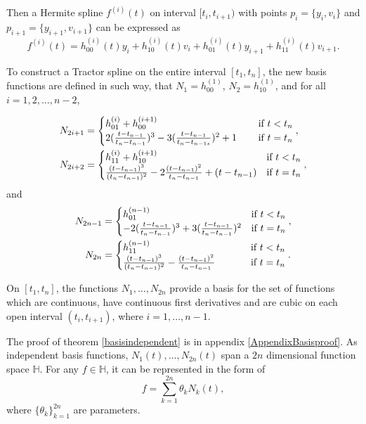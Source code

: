 Then a Hermite spline $f^{(i)}(t)$ on interval $[t_i,t_{i+1})$ with points $p_i=\{y_i,v_i\}$ and $p_{i+1}=\{y_{i+1},v_{i+1} \}$  can be expressed as
\begin{equation}
f^{(i)}(t)=h_{00}^{(i)}(t)y_i+h_{10}^{(i)}(t)v_i+h_{01}^{(i)}(t)y_{i+1} +h_{11}^{(i)}(t)v_{i+1}.
\end{equation}

To construct a Tractor spline on the entire interval $[t_1,t_n]$, the new basis functions are defined in such way, that $N_1 = h^{(1)}_{00}$, $N_2 = h^{(1)}_{10}$, and for all $i=1,2,\ldots,n-2$, 

\begin{align}
N_{2i+1}&=
\begin{cases}
h_{01}^{(i)}+h_{00}^{(i+1)} \hphantom{+(+t_{n}-t_{n-1}-t_{n})1.}  & \mbox{if $t<t_n$}\\
2(\frac{t-t_{n-1}}{t_{n}-t_{n-1}})^3-3(\frac{t-t_{n-1}}{t_{n}-t_{n-1s}})^2+1 &  \mbox{if $t=t_n$}
\end{cases},\\
N_{2i+2}&=
\begin{cases}
 h_{11}^{(i)}+h_{10}^{(i+1)} & \mbox{if $t<t_n$}\\
\frac{(t-t_{n-1})^3}{(t_{n}-t_{n-1})^2}-2\frac{(t-t_{n-1})^2}{t_{n}-t_{n-1}}+(t-t_{n-1}) & \mbox{if $t=t_n$}
\end{cases},
\end{align}
and
\begin{align}
N_{2n-1} &= 
\begin{cases}
h_{01}^{(n-1)} & \mbox{if $t<t_n$}\\ 
-2(\frac{t-t_{n-1}}{t_{n}-t_{n-1}})^3+3(\frac{t-t_{n-1}}{t_{n}-t_{n-1}})^2 & \mbox{if $t=t_n$}
\end{cases},\\
N_{2n} &= 
\begin{cases}
h_{11}^{(n-1)} & \mbox{if $t<t_n$}\\
\frac{(t-t_{n-1})^3}{(t_{n}-t_{n-1})^2}-\frac{(t-t_{n-1})^2}{t_{n}-t_{n-1}}  \hphantom{+t+.} & \mbox{if $t=t_n$}
\end{cases}.
\end{align}

\begin{theorem}\label{basisindependent}
On $[t_1,t_n]$, the functions $N_1,\ldots,N_{2n}$ provide a basis for the set of functions which are continuous, have continuous first derivatives and are 
cubic on each open interval $(t_i,t_{i+1})$, where $i=1, \ldots, n-1$.
\end{theorem}
The proof of theorem \ref{basisindependent} is in appendix \ref{AppendixBasisproof}.
As independent basis functions, $N_1(t), \ldots, N_{2n}(t)$ span a $2n$ dimensional function space $\mathbb{H}$. For any $f \in \mathbb{H}$, it can be represented in the form of
\begin{equation}
f=\sum_{k=1}^{2n} \theta_k N_k(t),
\end{equation}
where $\{\theta_k\}_{k=1}^{2n}$ are parameters.


